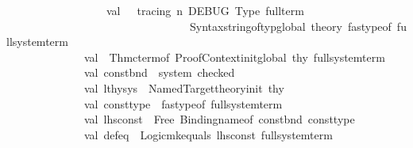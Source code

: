 \begin{isabellebody}
\ \ \ \ \ \ \ \ \ \ \ \ \ \ \ \ \ \ val\ {\isacharunderscore}{\kern0pt}\ {\isacharequal}{\kern0pt}\ tracing\ {\isacharparenleft}{\kern0pt}{\isachardoublequote}{\kern0pt}{\isacharbackslash}{\kern0pt}n\ {\isacharbrackleft}{\kern0pt}DEBUG{\isacharbrackright}{\kern0pt}\ Type\ full{\isacharunderscore}{\kern0pt}term\ {\isacharequal}{\kern0pt}\ {\isachardoublequote}{\kern0pt}\ {\isacharcircum}{\kern0pt}\isanewline
\ \ \ \ \ \ \ \ \ \ \ \ \ \ \ \ \ \ \ \ \ \ \ \ \ \ \ \ \ \ \ \ \ Syntax{\isachardot}{\kern0pt}string{\isacharunderscore}{\kern0pt}of{\isacharunderscore}{\kern0pt}typ{\isacharunderscore}{\kern0pt}global\ {\isacharat}{\kern0pt}{\isacharbraceleft}{\kern0pt}theory{\isacharbraceright}{\kern0pt}\ {\isacharparenleft}{\kern0pt}fastype{\isacharunderscore}{\kern0pt}of\ {\isacharparenleft}{\kern0pt}full{\isacharunderscore}{\kern0pt}system{\isacharunderscore}{\kern0pt}term{\isacharparenright}{\kern0pt}\ {\isacharparenright}{\kern0pt}{\isacharparenright}{\kern0pt}{\isacharasterisk}{\kern0pt}{\isacharparenright}{\kern0pt}\ \ \ \ \ \isanewline
\ \ \ \ \ \ \ \ \ \ \ \ \ \ \ \ \ \ \ \ \ \isanewline
\ \ \ \ \ \ \ \ \ \ \ \ \ \ val\ {\isacharunderscore}{\kern0pt}\ {\isacharequal}{\kern0pt}Thm{\isachardot}{\kern0pt}cterm{\isacharunderscore}{\kern0pt}of\ {\isacharparenleft}{\kern0pt}Proof{\isacharunderscore}{\kern0pt}Context{\isachardot}{\kern0pt}init{\isacharunderscore}{\kern0pt}global\ thy{\isacharprime}{\kern0pt}{\isacharparenright}{\kern0pt}\ full{\isacharunderscore}{\kern0pt}system{\isacharunderscore}{\kern0pt}term\isanewline
\ \ \ \ \ \ \ \ \ \ \ \ \ \ val\ const{\isacharunderscore}{\kern0pt}bnd\ {\isacharequal}{\kern0pt}\ {\isacharhash}{\kern0pt}system\ checked\isanewline
\ \ \ \ \ \ \ \ \ \ \ \ \ \ val\ lthy{\isacharunderscore}{\kern0pt}sys\ {\isacharequal}{\kern0pt}\ Named{\isacharunderscore}{\kern0pt}Target{\isachardot}{\kern0pt}theory{\isacharunderscore}{\kern0pt}init\ thy{\isacharprime}{\kern0pt}\isanewline
\ \ \ \ \ \ \ \ \ \ \ \ \ \ \isanewline
\isanewline
\ \ \ \ \ \ \ \ \ \ \ \ \ \ val\ const{\isacharunderscore}{\kern0pt}type\ {\isacharequal}{\kern0pt}\ fastype{\isacharunderscore}{\kern0pt}of\ full{\isacharunderscore}{\kern0pt}system{\isacharunderscore}{\kern0pt}term\isanewline
\ \ \ \ \ \ \ \ \ \ \ \ \ \ val\ lhs{\isacharunderscore}{\kern0pt}const\ {\isacharequal}{\kern0pt}\ Free\ {\isacharparenleft}{\kern0pt}Binding{\isachardot}{\kern0pt}name{\isacharunderscore}{\kern0pt}of\ const{\isacharunderscore}{\kern0pt}bnd{\isacharcomma}{\kern0pt}\ const{\isacharunderscore}{\kern0pt}type{\isacharparenright}{\kern0pt}\isanewline
\ \ \ \ \ \ \ \ \ \ \ \ \ \ val\ def{\isacharunderscore}{\kern0pt}eq\ {\isacharequal}{\kern0pt}\ Logic{\isachardot}{\kern0pt}mk{\isacharunderscore}{\kern0pt}equals\ {\isacharparenleft}{\kern0pt}lhs{\isacharunderscore}{\kern0pt}const{\isacharcomma}{\kern0pt}\ full{\isacharunderscore}{\kern0pt}system{\isacharunderscore}{\kern0pt}term{\isacharparenright}{\kern0pt}\isanewline

\end{isabellebody}
